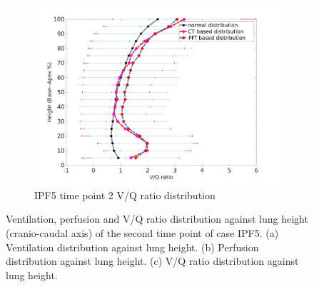 \begin{figure}[htbp]
\begin{subfigure}{.6\linewidth}
  \includegraphics[width=\linewidth,trim={{.0\wd0} {.0\wd0} {.0\wd0} {.0\wd0}},clip]{Appendix/Image_AppexB/IPF501/IPF501_VQAgainstLungHeight.png}
  \caption{IPF5 time point 2 V/Q ratio distribution}
  \label{fig:VQDistribution-c}
\end{subfigure}
\caption{ Ventilation, perfusion and V/Q ratio distribution against lung height (cranio-caudal axis) of the second time point of case IPF5. (a) Ventilation distribution against lung height. (b) Perfusion distribution against lung height. (c) V/Q ratio distribution against lung height.}
\label{fig:VQDistribution}
\end{figure}

